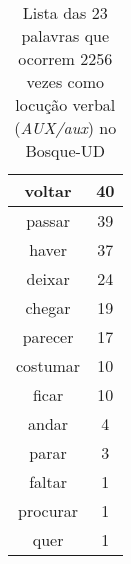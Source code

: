 \documentclass[output=paper,colorlinks,citecolor=brown]{langscibook}
\begin{document}
\begin{table}[]
{\begin{tabular}{|c|c|}
				voltar & 40\\\hline
				passar & 39\\\hline
				haver & 37\\\hline
				deixar & 24\\\hline
				chegar & 19\\\hline
				parecer & 17\\\hline
				costumar & 10\\\hline
				ficar & 10\\\hline
				andar & 4\\\hline
				parar & 3\\\hline
				faltar & 1\\\hline
				procurar & 1\\\hline
				quer & 1\\\hline
			\end{tabular}
		}
		\caption{Lista das 23 palavras que ocorrem 2256 vezes como locução verbal (\emph{AUX/aux}) no Bosque-UD}
		\label{tab:locucoesverbais}
	\end{table}
\end{document}
